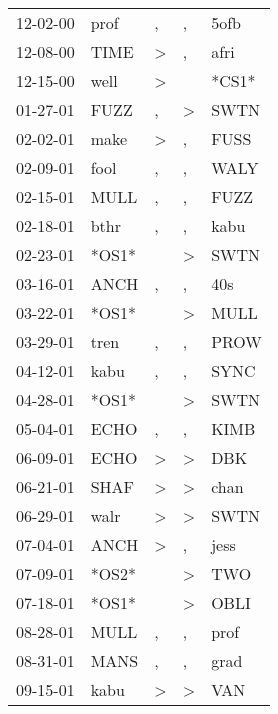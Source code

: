 \begin{supertabular}{lllll}
 12-02-00 &   prof &                , &                , &   5ofb \\
 12-08-00 &   TIME &     \textgreater &                , &   afri \\
 12-15-00 &   well &     \textgreater &                  &  *CS1* \\
 01-27-01 &   FUZZ &                , &     \textgreater &   SWTN \\
 02-02-01 &   make &     \textgreater &                , &   FUSS \\
 02-09-01 &   fool &                , &                , &   WALY \\
 02-15-01 &   MULL &                , &                , &   FUZZ \\
 02-18-01 &   bthr &                , &                , &   kabu \\
 02-23-01 &  *OS1* &                  &     \textgreater &   SWTN \\
 03-16-01 &   ANCH &                , &                , &    40s \\
 03-22-01 &  *OS1* &                  &     \textgreater &   MULL \\
 03-29-01 &   tren &                , &                , &   PROW \\
 04-12-01 &   kabu &                , &                , &   SYNC \\
 04-28-01 &  *OS1* &                  &     \textgreater &   SWTN \\
 05-04-01 &   ECHO &                , &                , &   KIMB \\
 06-09-01 &   ECHO &     \textgreater &     \textgreater &    DBK \\
 06-21-01 &   SHAF &     \textgreater &     \textgreater &   chan \\
 06-29-01 &   walr &     \textgreater &     \textgreater &   SWTN \\
 07-04-01 &   ANCH &     \textgreater &                , &   jess \\
 07-09-01 &  *OS2* &                  &     \textgreater &    TWO \\
 07-18-01 &  *OS1* &                  &     \textgreater &   OBLI \\
 08-28-01 &   MULL &                , &                , &   prof \\
 08-31-01 &   MANS &                , &                , &   grad \\
 09-15-01 &   kabu &     \textgreater &     \textgreater &    VAN \\

\end{supertabular}
